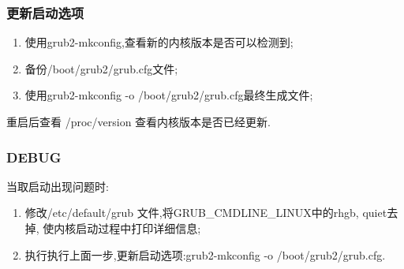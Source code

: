 \begin{frame}
\frametitle{更新启动选项}
\begin{enumerate}
\item 使用grub2-mkconfig,查看新的内核版本是否可以检测到;
\item 备份/boot/grub2/grub.cfg文件;
\item 使用grub2-mkconfig -o /boot/grub2/grub.cfg最终生成文件;
\end{enumerate}
重启后查看 /proc/version 查看内核版本是否已经更新.
\end{frame}

\begin{frame}
\frametitle{DEBUG}
当取启动出现问题时:
\begin{enumerate}
\item 修改/etc/default/grub 文件,将GRUB_CMDLINE_LINUX中的rhgb, quiet去掉, 
        使内核启动过程中打印详细信息;
\item 执行执行上面一步,更新启动选项:grub2-mkconfig -o /boot/grub2/grub.cfg.
\end{enumerate}

\end{frame}



